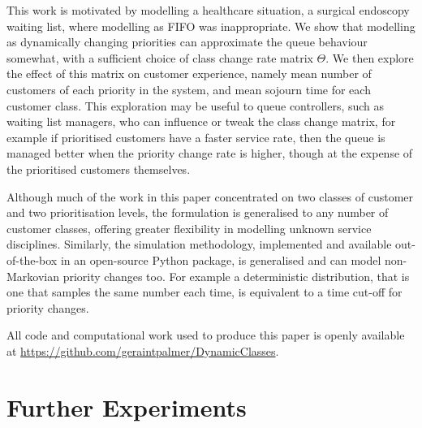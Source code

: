\documentclass{article}
\begin{document}
This work is motivated by modelling a healthcare situation, a surgical endoscopy
waiting list, where modelling as FIFO was inappropriate. We show that modelling
as dynamically changing priorities can approximate the queue behaviour somewhat,
with a sufficient choice of class change rate matrix $\Theta$. We then explore
the effect of this matrix on customer experience, namely mean number of
customers of each priority in the system, and mean sojourn time for each
customer class. This exploration may be useful to queue controllers, such as
waiting list managers, who can influence or tweak the class change matrix, for
example if prioritised customers have a faster service rate, then the queue is
managed better when the priority change rate is higher, though at the expense of
the prioritised customers themselves.

Although much of the work in this paper concentrated on two classes of customer
and two prioritisation levels, the formulation is generalised to any number of
customer classes, offering greater flexibility in modelling unknown service
disciplines. Similarly, the simulation methodology, implemented and available
out-of-the-box in an open-source Python package, is generalised and can model
non-Markovian priority changes too. For example a deterministic distribution,
that is one that samples the same number each time, is equivalent to a time
cut-off for priority changes.

All code and computational work used to produce this paper is openly available
at \url{https://github.com/geraintpalmer/DynamicClasses}.




\newpage
\appendix

\section{Further Experiments}\label{apx:more_priority_classes}
\end{document}
